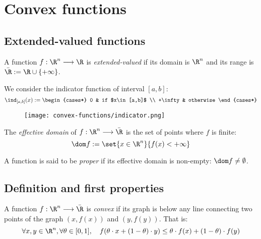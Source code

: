 \section{Convex functions}
\subsection{Extended-valued functions}
\begin{definition}
    A function $f: \R^n \longrightarrow \R$ is \emph{extended-valued} if its domain is $\R^n$ and its range is $\bar{\R} := \R \cup \{+\infty\}$.
\end{definition}

\begin{example}
    We consider the indicator function of interval $[a, b]$:
    \begin{equation*}
        \ind_{[a,b]}(x) := \begin{cases*}
            0 & if $x\in[a,b]$ \\
            +\infty & otherwise
        \end{cases*}
    \end{equation*}
    \begin{figure}[H]
        \centering
        \texttt{[image: convex-functions/indicator.png]}
    \end{figure}
\end{example}

\begin{definition}
    The \emph{effective domain} of $f:\R^n\longrightarrow\bar{\R}$ is the set of points where $f$ is finite:
    \begin{equation*}
        \dom f := \set{x\in\R^n}{f(x)<+\infty}
    \end{equation*}
\end{definition}

A function is said to be \emph{proper} if its effective domain is non-empty: $\dom f \neq \emptyset$.

\subsection{Definition and first properties}
\begin{definition}
    A function $f:\R^n\longrightarrow\bar{\R}$ is \emph{convex} if its graph is below any line connecting two points of the graph $(x, f(x))$ and $(y, f(y))$. That is:
    \begin{equation*}
        \forall x,y\in\R^n, \forall\theta\in[0,1], \quad f(\theta\cdot x + (1-\theta)\cdot y) \leq \theta\cdot f(x) + (1-\theta)\cdot f(y)
    \end{equation*}
\end{definition}

